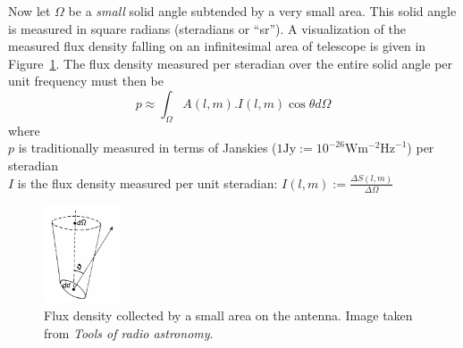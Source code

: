 Now let $\Omega$ be a \textit{small} solid angle subtended by a very small area. This solid angle is measured in square radians (steradians or ``sr''). A visualization 
of the measured flux density falling on an infinitesimal area of telescope is given in Figure~\ref{fig_measuring_source_brightness}. The flux density measured 
per steradian over the entire solid angle per unit frequency must then be 
  \begin{equation}
    p \approx \int_{\Omega}{A(l,m).I(l,m)\cos{\theta}d\Omega}
    \label{REF_EQN_SINGLE_ANTENNA}
  \end{equation}
where\\
  $p$ is traditionally measured in terms of Janskies ($1\text{Jy} := 10^{-26}\text{W}\text{m}^{-2}\text{Hz}^{-1}$) per steradian\\
  $I$ is the flux density measured per unit steradian: $I(l,m) := \frac{\Delta S(l,m)}{\Delta\Omega}$\\
\begin{figure}[ht]
\begin{mdframed}
 \centering
 \includegraphics[width=0.2\textwidth]{images/measuring_source_brightness.png}
 \caption[Source brightness]{Flux density collected by a small area on the antenna. Image taken from \textit{Tools of radio astronomy}\cite{wilson2009tools}.}
 \label{fig_measuring_source_brightness}
\end{mdframed}
\end{figure}

